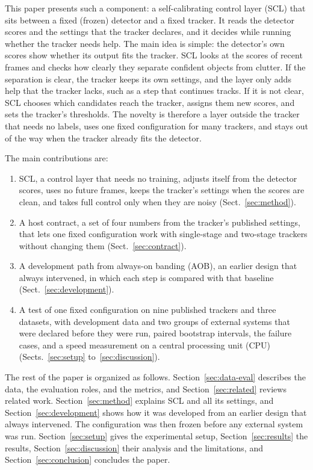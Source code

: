 \documentclass[pdflatex,sn-mathphys-num]{sn-jnl}
\newcommand{\scl}{SCL}
\newcommand{\aob}{AOB}
\begin{document}
This paper presents such a component: a self-calibrating control layer (\scl{})
that sits between a fixed (frozen) detector and a fixed tracker. It reads the
detector scores and the settings that the tracker declares, and it decides
while running whether the tracker needs help. The main idea is simple: the
detector's own scores show whether its output fits the tracker. \scl{} looks
at the scores of recent frames and checks how clearly they separate confident
objects from clutter. If the separation is clear, the tracker keeps its own
settings, and the layer only adds help that the tracker lacks, such as a step
that continues tracks. If it is not clear, \scl{} chooses which candidates
reach the tracker, assigns them new scores, and sets the tracker's thresholds.
The novelty is therefore a layer outside the tracker that needs no labels,
uses one fixed configuration for many trackers, and stays out of the way when
the tracker already fits the detector.

The main contributions are:
\begin{enumerate}
\item \scl{}, a control layer that needs no training, adjusts itself from the
      detector scores, uses no future frames, keeps the tracker's settings
      when the scores are clean, and takes full control only when they are
      noisy (Sect.~\ref{sec:method}).
\item A host contract, a set of four numbers from the tracker's published
      settings, that lets one fixed configuration work with single-stage and
      two-stage trackers without changing them (Sect.~\ref{sec:contract}).
\item A development path from always-on banding (\aob{}), an earlier design
      that always intervened, in which each step is compared with that
      baseline (Sect.~\ref{sec:development}).
\item A test of one fixed configuration on nine published trackers and three
      datasets, with development data and two groups of external systems
      that were declared before they were run, paired bootstrap intervals,
      the failure cases, and a speed measurement on a central processing
      unit (CPU) (Sects.~\ref{sec:setup} to~\ref{sec:discussion}).
\end{enumerate}

The rest of the paper is organized as follows. Section~\ref{sec:data-eval}
describes the data, the evaluation roles, and the metrics, and
Section~\ref{sec:related} reviews related work. Section~\ref{sec:method}
explains \scl{} and all its settings, and Section~\ref{sec:development} shows
how it was developed from an earlier design that always intervened. The
configuration was then frozen before any external system was run.
Section~\ref{sec:setup} gives the experimental setup,
Section~\ref{sec:results} the results, Section~\ref{sec:discussion} their
analysis and the limitations, and Section~\ref{sec:conclusion} concludes the
paper.
\end{document}
